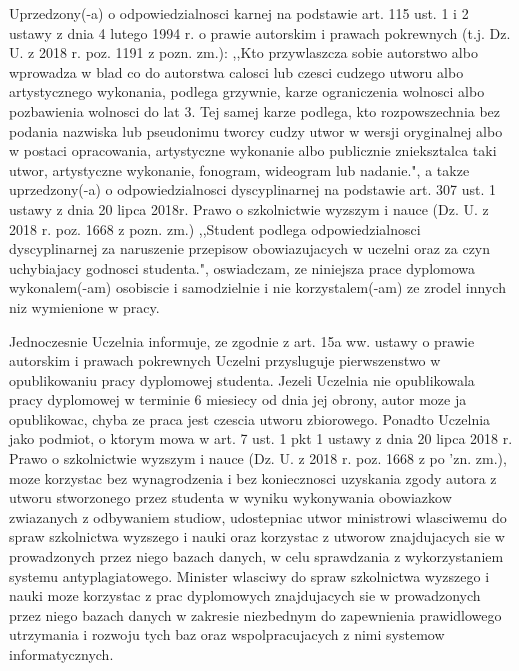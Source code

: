 \documentclass[a4paper,12pt]{article}
\begin{document}
{%
{Uprzedzony(-a) o odpowiedzialnosci karnej na podstawie art. 115 ust. 1 i 2 ustawy z dnia 4 lutego 1994 r. o prawie autorskim i prawach pokrewnych (t.j. Dz. U. z 2018 r. poz. 1191 z pozn. zm.): ,,Kto przywlaszcza sobie autorstwo albo wprowadza w blad co do autorstwa calosci lub czesci cudzego utworu albo artystycznego wykonania, podlega grzywnie, karze ograniczenia wolnosci albo pozbawienia wolnosci do lat 3. Tej samej karze podlega, kto rozpowszechnia bez podania nazwiska lub pseudonimu tworcy cudzy utwor w wersji oryginalnej albo w postaci opracowania, artystyczne wykonanie albo publicznie znieksztalca taki utwor, artystyczne wykonanie, fonogram, wideogram lub nadanie.", a takze uprzedzony(-a) o odpowiedzialnosci dyscyplinarnej na podstawie art. 307 ust. 1 ustawy z dnia 20 lipca 2018r. Prawo o szkolnictwie wyzszym i nauce (Dz. U. z 2018 r. poz. 1668 z pozn. zm.) ,,Student podlega odpowiedzialnosci dyscyplinarnej za naruszenie przepisow obowiazujacych w uczelni oraz za czyn uchybiajacy godnosci studenta.", oswiadczam, ze niniejsza prace dyplomowa wykonalem(-am) osobiscie i samodzielnie i nie korzystalem(-am) ze zrodel innych niz wymienione w pracy.

\bigskip

Jednoczesnie Uczelnia informuje, ze zgodnie z art. 15a ww. ustawy o prawie autorskim i prawach pokrewnych Uczelni przysluguje pierwszenstwo w opublikowaniu pracy dyplomowej studenta. Jezeli Uczelnia nie opublikowala pracy dyplomowej w terminie 6 miesiecy od dnia jej obrony, autor moze ja opublikowac, chyba ze praca jest czescia utworu zbiorowego. Ponadto Uczelnia jako podmiot, o ktorym mowa w art. 7 ust. 1 pkt 1 ustawy z dnia 20 lipca 2018 r. Prawo o szkolnictwie wyzszym i nauce (Dz. U. z 2018 r. poz. 1668 z po 'zn. zm.), moze korzystac bez wynagrodzenia i bez koniecznosci uzyskania zgody autora z utworu stworzonego przez studenta w wyniku wykonywania obowiazkow zwiazanych z odbywaniem studiow, udostepniac utwor ministrowi wlasciwemu do spraw szkolnictwa wyzszego i nauki oraz korzystac z utworow znajdujacych sie w prowadzonych przez niego bazach danych, w celu sprawdzania z wykorzystaniem systemu antyplagiatowego. Minister wlasciwy do spraw szkolnictwa wyzszego i nauki moze korzystac z prac dyplomowych znajdujacych sie w prowadzonych przez niego bazach danych w zakresie niezbednym do zapewnienia prawidlowego utrzymania i rozwoju tych baz oraz wspolpracujacych z nimi systemow informatycznych.}\\

}
\end{document}
